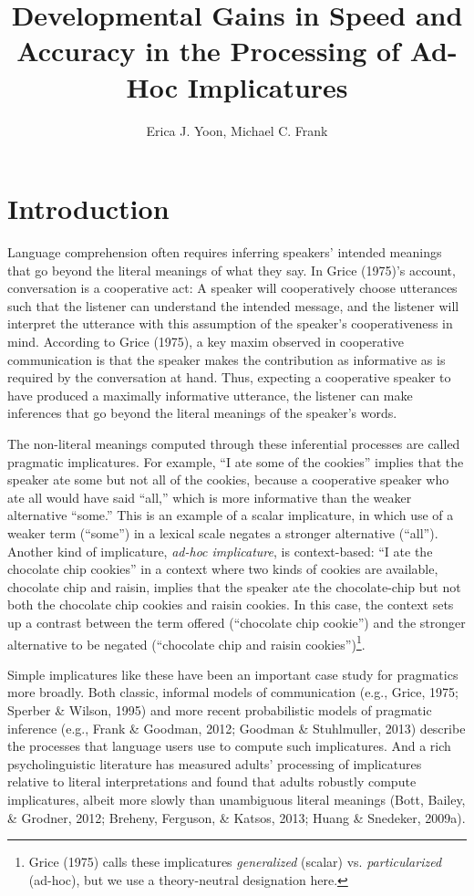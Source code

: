\documentclass[a4paper,man,apacite,floatsintext]{apa6}
\date{}
\title{\textbf{Developmental Gains in Speed and Accuracy in the Processing of Ad-Hoc
Implicatures}}
\author{Erica J. Yoon, Michael C. Frank}
\affiliation{Department of Psychology, Stanford University}
\begin{document}
\maketitle

\section{Introduction}\label{introduction}

Language comprehension often requires inferring speakers' intended
meanings that go beyond the literal meanings of what they say. In Grice
(1975)'s account, conversation is a cooperative act: A speaker will
cooperatively choose utterances such that the listener can understand
the intended message, and the listener will interpret the utterance with
this assumption of the speaker's cooperativeness in mind. According to
Grice (1975), a key maxim observed in cooperative communication is that
the speaker makes the contribution as informative as is required by the
conversation at hand. Thus, expecting a cooperative speaker to have
produced a maximally informative utterance, the listener can make
inferences that go beyond the literal meanings of the speaker's words.

The non-literal meanings computed through these inferential processes
are called pragmatic implicatures. For example, ``I ate some of the
cookies'' implies that the speaker ate some but not all of the cookies,
because a cooperative speaker who ate all would have said ``all,'' which
is more informative than the weaker alternative ``some.'' This is an
example of a scalar implicature, in which use of a weaker term
(``some'') in a lexical scale negates a stronger alternative (``all'').
Another kind of implicature, \emph{ad-hoc implicature}, is
context-based: ``I ate the chocolate chip cookies'' in a context where
two kinds of cookies are available, chocolate chip and raisin, implies
that the speaker ate the chocolate-chip but not both the chocolate chip
cookies and raisin cookies. In this case, the context sets up a contrast
between the term offered (``chocolate chip cookie'') and the stronger
alternative to be negated (``chocolate chip and raisin
cookies'')\footnote{Grice (1975) calls these implicatures
  \emph{generalized} (scalar) vs. \emph{particularized} (ad-hoc), but we
  use a theory-neutral designation here.}.

Simple implicatures like these have been an important case study for
pragmatics more broadly. Both classic, informal models of communication
(e.g., Grice, 1975; Sperber \& Wilson, 1995) and more recent
probabilistic models of pragmatic inference (e.g., Frank \& Goodman,
2012; Goodman \& Stuhlmuller, 2013) describe the processes that language
users use to compute such implicatures. And a rich psycholinguistic
literature has measured adults' processing of implicatures relative to
literal interpretations and found that adults robustly compute
implicatures, albeit more slowly than unambiguous literal meanings
(Bott, Bailey, \& Grodner, 2012; Breheny, Ferguson, \& Katsos, 2013;
Huang \& Snedeker, 2009a).
\end{document}
